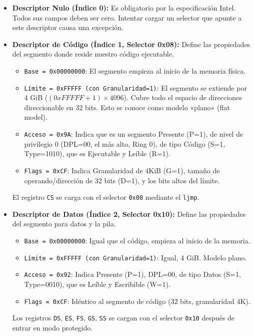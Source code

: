 \begin{itemize}
    \item \textbf{Descriptor Nulo (Índice 0):} Es obligatorio por la especificación Intel. Todos sus campos deben ser cero. Intentar cargar un selector que apunte a este descriptor causa una excepción.
    \item \textbf{Descriptor de Código (Índice 1, Selector 0x08):} Define las propiedades del segmento donde reside nuestro código ejecutable.
        \begin{itemize}
            \item \texttt{Base = 0x00000000}: El segmento empieza al inicio de la memoria física.
            \item \texttt{Límite = 0xFFFFF (con Granularidad=1)}: El segmento se extiende por 4 GiB (\( (0xFFFFF + 1) \times 4096 \)). Cubre todo el espacio de direcciones direccionable en 32 bits. Esto se conoce como modelo «plano» (flat model).
            \item \texttt{Acceso = 0x9A}: Indica que es un segmento Presente (P=1), de nivel de privilegio 0 (DPL=00, el más alto, Ring 0), de tipo Código (S=1, Type=1010), que es Ejecutable y Leíble (R=1).
            \item \texttt{Flags = 0xCF}: Indica Granularidad de 4KiB (G=1), tamaño de operando/dirección de 32 bits (D=1), y los bits altos del límite.
        \end{itemize}
        El registro \texttt{CS} se carga con el selector \texttt{0x08} mediante el \texttt{ljmp}.
    \item \textbf{Descriptor de Datos (Índice 2, Selector 0x10):} Define las propiedades del segmento para datos y la pila.
        \begin{itemize}
            \item \texttt{Base = 0x00000000}: Igual que el código, empieza al inicio de la memoria.
            \item \texttt{Límite = 0xFFFFF (con Granularidad=1)}: Igual, 4 GiB. Modelo plano.
            \item \texttt{Acceso = 0x92}: Indica Presente (P=1), DPL=00, de tipo Datos (S=1, Type=0010), que es Leíble y Escribible (W=1).
            \item \texttt{Flags = 0xCF}: Idéntico al segmento de código (32 bits, granularidad 4K).
        \end{itemize}
        Los registros \texttt{DS}, \texttt{ES}, \texttt{FS}, \texttt{GS}, \texttt{SS} se cargan con el selector \texttt{0x10} después de entrar en modo protegido.
\end{itemize}

